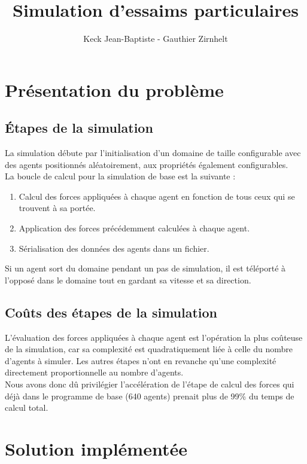 \documentclass[12pt,a4paper,sans]{article}
\title{Simulation d'essaims particulaires}
\author{Keck Jean-Baptiste - Gauthier Zirnhelt}
\begin{document}
\maketitle



\section{Présentation du problème}

\subsection{Étapes de la simulation}
La simulation débute par l'initialisation d'un domaine de taille configurable avec des agents positionnés aléatoirement, aux propriétés également configurables.\\
La boucle de calcul pour la simulation de base est la suivante :
\begin{enumerate}
    \item Calcul des forces appliquées à chaque agent en fonction de tous ceux qui se trouvent à sa portée.
    \item Application des forces précédemment calculées à chaque agent.
    \item Sérialisation des données des agents dans un fichier.
\end{enumerate}
Si un agent sort du domaine pendant un pas de simulation, il est téléporté à l'opposé dans le domaine tout en gardant sa vitesse et sa direction.

\subsection{Coûts des étapes de la simulation}
L'évaluation des forces appliquées à chaque agent est l'opération la plus coûteuse de la simulation, car sa complexité est quadratiquement liée à celle du nombre d'agents à simuler. Les autres étapes n'ont en revanche qu'une complexité directement proportionnelle au nombre d'agents.\\
Nous avons donc dû privilégier l'accélération de l'étape de calcul des forces qui déjà dans le programme de base (640 agents) prenait plus de 99\% du temps de calcul total.



\newpage
\section{Solution implémentée}
\end{document}

